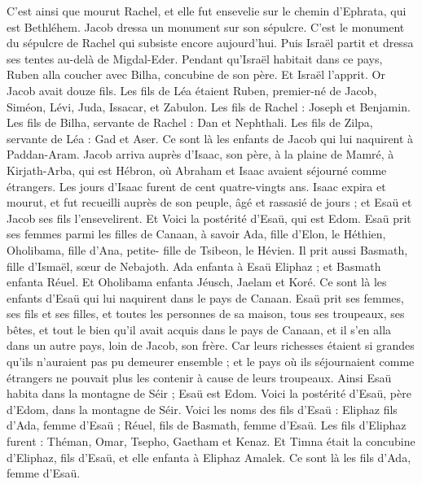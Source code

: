 \begin{multicols}{2}
C'est ainsi que mourut Rachel, et elle fut ensevelie sur le chemin d'Ephrata, qui est Bethléhem.
Jacob dressa un monument sur son sépulcre. C'est le monument du sépulcre de Rachel qui subsiste encore aujourd'hui.
Puis Israël partit et dressa ses tentes au-delà de Migdal-Eder.
Pendant qu’Israël habitait dans ce pays, Ruben alla coucher avec Bilha, concubine de son père.  Et Israël l'apprit. Or Jacob avait douze fils.
Les fils de Léa étaient Ruben, premier-né de Jacob, Siméon, Lévi, Juda, Issacar, et Zabulon.
Les fils de Rachel : Joseph et Benjamin.
Les fils de Bilha, servante de Rachel : Dan et Nephthali.
Les fils de Zilpa, servante de Léa : Gad et Aser. Ce sont là les enfants de Jacob qui lui naquirent à Paddan-Aram.
Jacob arriva auprès d’Isaac, son père, à la plaine de Mamré, à Kirjath-Arba, qui est Hébron, où Abraham et Isaac avaient séjourné comme étrangers.
Les jours d’Isaac furent de cent quatre-vingts ans.
Isaac expira et mourut, et fut recueilli auprès de son peuple, âgé et rassasié de jours ; et Esaü et Jacob ses fils l'ensevelirent.
\VerseOne{}Et Voici la postérité d'Esaü, qui est Edom.
Esaü prit ses femmes parmi les filles de Canaan, à savoir Ada, fille d'Elon, le Héthien, Oholibama, fille d’Ana, petite- fille de Tsibeon, le Hévien.
Il prit aussi Basmath, fille d'Ismaël, sœur de Nebajoth.
Ada enfanta à Esaü Eliphaz ; et Basmath enfanta Réuel.
Et Oholibama enfanta Jéusch, Jaelam et Koré. Ce sont là les enfants d'Esaü qui lui naquirent dans le  pays de Canaan.
Esaü prit ses femmes, ses fils et ses filles, et toutes les personnes de sa maison, tous ses troupeaux, ses bêtes, et tout le bien qu'il avait acquis dans le pays de Canaan, et il s'en alla dans un autre pays, loin de Jacob, son frère.
Car leurs richesses étaient si grandes qu'ils n'auraient pas pu demeurer ensemble ; et le pays où ils séjournaient comme étrangers ne pouvait plus les contenir à cause de leurs troupeaux.
Ainsi Esaü habita dans la montagne de Séir ; Esaü est Edom.
Voici la postérité d'Esaü, père d'Edom, dans la montagne de Séir.
Voici les noms des fils d'Esaü : Eliphaz fils d’Ada, femme d'Esaü ; Réuel, fils de Basmath, femme d'Esaü.
Les fils d'Eliphaz furent : Théman, Omar, Tsepho, Gaetham et Kenaz.
Et Timna était la concubine d'Eliphaz, fils d'Esaü, et elle enfanta à Eliphaz Amalek. Ce sont là les fils d’Ada, femme d'Esaü.

\end{multicols}
